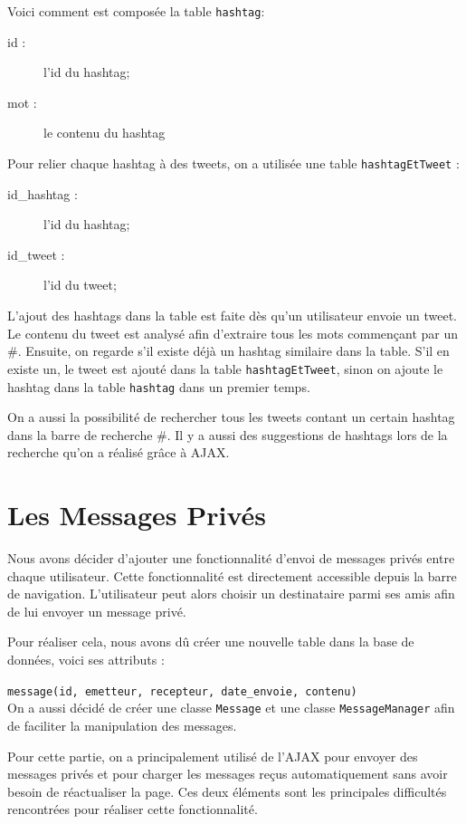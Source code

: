 \documentclass[a4paper, 12pt]{article}
\begin{document}
Voici comment est composée la table \texttt{hashtag}:
\begin{description}
\item[id :] l'id du hashtag;
\item[mot :] le contenu du hashtag
\end{description}
Pour relier chaque hashtag à des tweets, on a utilisée une table \texttt{hashtagEtTweet} : 
\begin{description}
\item[id\_hashtag :] l'id du hashtag;
\item[id\_tweet :] l'id du tweet;
\end{description}

L'ajout des hashtags dans la table est faite dès qu'un utilisateur envoie un tweet. Le contenu du tweet est analysé afin d'extraire tous les mots commençant par un \#. Ensuite, on regarde s'il existe déjà un hashtag similaire dans la table. S'il en existe un, le tweet est ajouté dans la table \texttt{hashtagEtTweet}, sinon on ajoute le hashtag dans la table \texttt{hashtag} dans un premier temps.
\vspace{1\baselineskip}

On a aussi la possibilité de rechercher tous les tweets contant un certain hashtag dans la barre de recherche \#. Il y a aussi des suggestions de hashtags lors de la recherche qu'on a réalisé grâce à AJAX.

\section{Les Messages Privés}	
Nous avons décider d'ajouter une fonctionnalité d'envoi de messages privés entre chaque utilisateur. 
Cette fonctionnalité est directement accessible depuis la barre de navigation. L'utilisateur peut alors choisir un destinataire parmi ses amis afin de lui envoyer un message privé.

Pour réaliser cela, nous avons dû créer une nouvelle table dans la base de données, voici ses attributs :

 \texttt{message(id, emetteur, recepteur, date\_envoie, contenu)}\\		
On a aussi décidé de créer une classe \texttt{Message} et une classe \texttt{MessageManager} afin de faciliter la manipulation des messages. 

\vspace{2\baselineskip}

Pour cette partie, on a principalement utilisé de l'AJAX pour envoyer des messages privés et pour charger les messages reçus automatiquement sans avoir besoin de réactualiser la page. Ces deux éléments sont les principales difficultés rencontrées pour réaliser cette fonctionnalité.
\end{document}
